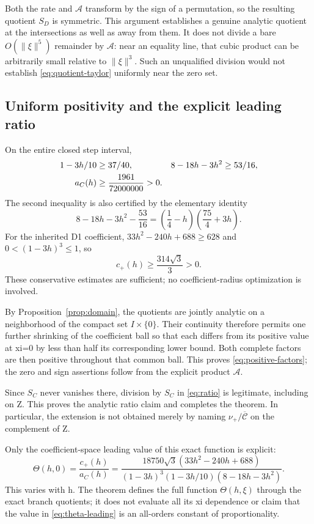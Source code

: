 \documentclass[11pt,a4paper]{article}
\numberwithin{equation}{section}
\theoremstyle{remark}\newtheorem{remark}[theorem]{Remark}
\newcommand{\calA}{\mathcal A}\newcommand{\calC}{\mathcal C}\newcommand{\Cbar}{\overline{\mathcal C}}
\begin{document}
Both the rate and $\calA$ transform by the sign of a permutation, so the resulting quotient $S_D$ is symmetric. This argument establishes a genuine analytic quotient at the intersections as well as away from them. It does not divide a bare $O(\|\xi\|^5)$ remainder by $\calA$: near an equality line, that cubic product can be arbitrarily small relative to $\|\xi\|^3$. Such an unqualified division would not establish \eqref{eq:quotient-taylor} uniformly near the zero set.

\clearpage
\subsection{Uniform positivity and the explicit leading ratio}\label{sec:positivity}
On the entire closed step interval,
\begin{align}
1-3h/10&\ge37/40,&8-18h-3h^2&\ge53/16,\notag\\
a_C(h)&\ge\frac{1961}{72000000}>0.\label{eq:aCbound}
\end{align}
The second inequality is also certified by the elementary identity
\begin{equation}
8-18h-3h^2-\frac{53}{16}
=\left(\frac14-h\right)\left(\frac{75}{4}+3h\right).
\label{eq:bound-identity}
\end{equation}
For the inherited D1 coefficient, $33h^2-240h+688\ge628$ and $0<(1-3h)^3\le1$, so
\begin{equation}
c_+(h)\ge\frac{314\sqrt3}{3}>0.
\label{eq:cDbound}
\end{equation}
These conservative estimates are sufficient; no coefficient-radius optimization is involved.

By Proposition~\ref{prop:domain}, the quotients are jointly analytic on a neighborhood of the compact set $I\times\{0\}$. Their continuity therefore permits one further shrinking of the coefficient ball so that each differs from its positive value at xi=0 by less than half its corresponding lower bound. Both complete factors are then positive throughout that common ball. This proves \eqref{eq:positive-factors}; the zero and sign assertions follow from the explicit product $\calA$.

Since $S_C$ never vanishes there, division by $S_C$ in \eqref{eq:ratio} is legitimate, including on Z. This proves the analytic ratio claim and completes the theorem. In particular, the extension is not obtained merely by naming $\nu_+/\Cbar$ on the complement of Z.

Only the coefficient-space leading value of this exact function is explicit:
\begin{equation}
\boxed{\Theta(h,0)=\frac{c_+(h)}{a_C(h)}
=\frac{18750\sqrt3(33h^2-240h+688)}
{(1-3h)^3(1-3h/10)(8-18h-3h^2)}}.
\label{eq:theta-leading}
\end{equation}
This varies with h. The theorem defines the full function $\Theta(h,\xi)$ through the exact branch quotients; it does not evaluate all its xi dependence or claim that the value in \eqref{eq:theta-leading} is an all-orders constant of proportionality.
\end{document}
